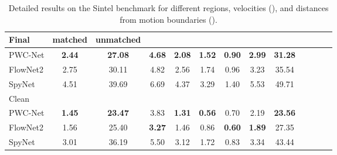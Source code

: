 \documentclass[10pt,journal,cspaper,compsoc]{IEEEtran}
\newcommand{\bd}[1]{\textbf{#1}}
\begin{document}
	\begin{table}[!t]
		\caption{Detailed results on the Sintel benchmark for different regions,  velocities (), and distances from motion boundaries ().}
		\label{tab:result:sintel:comparison} 	\vspace{-2mm}
		\footnotesize
		\centering
		\setlength\tabcolsep{1pt} \begin{tabular}{lcccccccccccc} \\
			Final  & 	 matched	& unmatched&  &	&&		&	&\\ \hline
			PWC-Net &\bd{2.44}&\bd{27.08}&\bd{4.68}&\bd{2.08}&\bd{1.52}&\bd{0.90}&\bd{2.99}&\bd{31.28}\\
			FlowNet2 &2.75&30.11&4.82&2.56&1.74&0.96&3.23&35.54\\
			SpyNet &4.51&39.69&6.69&4.37&3.29&1.40&5.53&49.71\\
			\hline Clean \\
			PWC-Net &\bd{1.45}&\bd{23.47}&3.83&\bd{1.31}&\bd{0.56}&0.70&2.19&\bd{23.56}\\
			FlowNet2 &1.56&25.40&\bd{3.27}&1.46&0.86&\bd{0.60}&\bd{1.89}&27.35\\
			SpyNet &3.01&36.19&5.50&3.12&1.72&0.83&3.34&43.44\\
		\end{tabular}
	\end{table}
	
\end{document}
